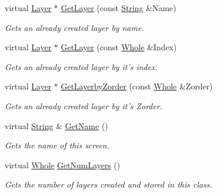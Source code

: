 \begin{DoxyCompactItemize}
virtual \hyperlink{classMezzanine_1_1UI_1_1Layer}{Layer} $\ast$ \hyperlink{classMezzanine_1_1UI_1_1Screen_ac61f47f88af6f4ee6a4f0b705c37647b}{GetLayer} (const \hyperlink{namespaceMezzanine_acf9fcc130e6ebf08e3d8491aebcf1c86}{String} \&Name)
\begin{DoxyCompactList}\small\item\em Gets an already created layer by name. \item\end{DoxyCompactList}\item 
virtual \hyperlink{classMezzanine_1_1UI_1_1Layer}{Layer} $\ast$ \hyperlink{classMezzanine_1_1UI_1_1Screen_abdfa0751c3738ef9545cb36096dcf7a6}{GetLayer} (const \hyperlink{namespaceMezzanine_adcbb6ce6d1eb4379d109e51171e2e493}{Whole} \&Index)
\begin{DoxyCompactList}\small\item\em Gets an already created layer by it's index. \item\end{DoxyCompactList}\item 
virtual \hyperlink{classMezzanine_1_1UI_1_1Layer}{Layer} $\ast$ \hyperlink{classMezzanine_1_1UI_1_1Screen_a6c9bc9b6161920d4f8c6b7bda7931af1}{GetLayerbyZorder} (const \hyperlink{namespaceMezzanine_adcbb6ce6d1eb4379d109e51171e2e493}{Whole} \&Zorder)
\begin{DoxyCompactList}\small\item\em Gets an already created layer by it's Zorder. \item\end{DoxyCompactList}\item 
virtual \hyperlink{namespaceMezzanine_acf9fcc130e6ebf08e3d8491aebcf1c86}{String} \& \hyperlink{classMezzanine_1_1UI_1_1Screen_a5f1f23c666513a658e7297a0bea49629}{GetName} ()
\begin{DoxyCompactList}\small\item\em Gets the name of this screen. \item\end{DoxyCompactList}\item 
virtual \hyperlink{namespaceMezzanine_adcbb6ce6d1eb4379d109e51171e2e493}{Whole} \hyperlink{classMezzanine_1_1UI_1_1Screen_aa76a0066086f4d4b1968cfb18ddcb96c}{GetNumLayers} ()
\begin{DoxyCompactList}\small\item\em Gets the number of layers created and stored in this class. \item\end{DoxyCompactList}\item 

\end{DoxyCompactItemize}
